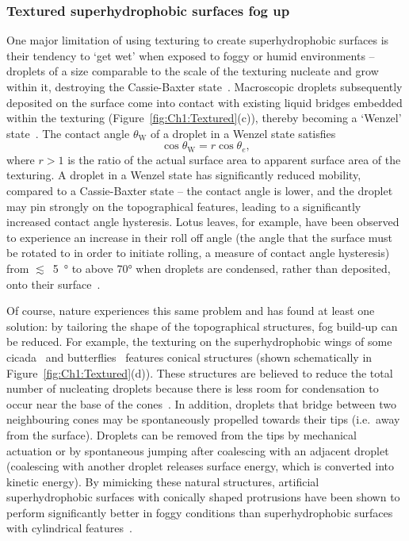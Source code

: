 \subsubsection{Textured superhydrophobic surfaces fog up}
One major limitation of using texturing to create superhydrophobic surfaces is their tendency to ‘get wet’ when exposed to foggy or humid environments -- droplets of a size comparable to the scale of the texturing nucleate and grow within it, destroying the Cassie-Baxter state~\citep{Dorrer2007Langmuir,Varanasi2009APL}. Macroscopic droplets subsequently deposited on the surface come into contact with existing liquid bridges embedded within the texturing (Figure~\ref{fig:Ch1:Textured}(c)), thereby becoming a `Wenzel' state~\citep{Wenzel1949JPhysChem}. The contact angle $\theta_{\text{W}}$ of a droplet in a Wenzel state satisfies
\begin{equation}
\cos \theta_{\text{W}} = r\cos \theta_e,
\end{equation}
where $r>1$ is the ratio of the actual surface area to apparent surface area of the texturing. A droplet in a Wenzel state has significantly reduced mobility, compared to a Cassie-Baxter state -- the contact angle is lower, and the droplet may pin strongly on the topographical features, leading to a significantly increased contact angle hysteresis. Lotus leaves, for example, have been observed to experience an increase in their roll off angle (the angle that the surface must be rotated to in order to initiate rolling, a measure of contact angle hysteresis) from $\lesssim$~\si{5~\si{\degree}} to above 70\si{\degree} when droplets are condensed, rather than deposited, onto their surface~\citep{Cheng2005aAPL,Cheng2005bAPL}.

Of course, nature experiences this same problem and has found at least one solution: by tailoring the shape of the topographical structures, fog build-up can be reduced. For example, the texturing on  the superhydrophobic wings of some cicada~\citep{Wisdom2013PNAS} and butterflies~\citep{Chen2018PLOSone} features conical structures (shown schematically in Figure~\ref{fig:Ch1:Textured}(d)). These structures are believed to reduce the total  number of nucleating droplets because there is less room for condensation to occur near the base of the cones~\citep{Xu2016RSCadv}.  In addition, droplets that bridge between two neighbouring cones may be spontaneously propelled towards their tips (i.e.~away from the surface). Droplets can be removed from the tips by mechanical actuation or by spontaneous jumping after coalescing with an adjacent droplet~\citep{Boreyko2009PRL, Boreyko2010PhysFlu} (coalescing with another droplet releases surface energy, which is converted into kinetic energy). By mimicking these natural structures,  artificial superhydrophobic surfaces with conically shaped protrusions have been shown to perform significantly better in foggy conditions than superhydrophobic surfaces with cylindrical features~\citep{Mouterde2017NatMater}.

